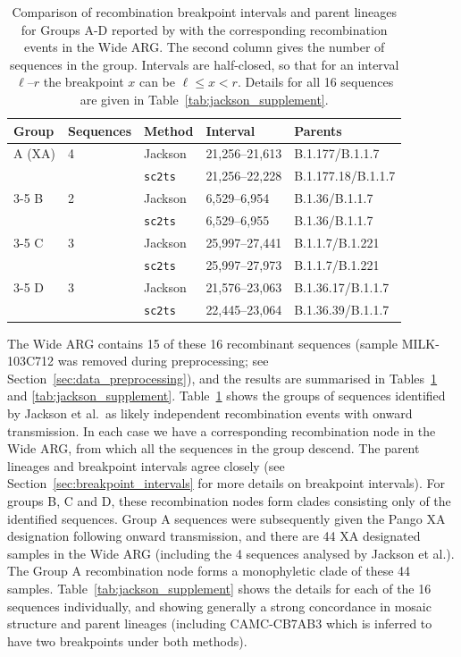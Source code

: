 \documentclass{article}
\begin{document}
\begin{table} \centering
\begin{tabular}{lllll}
\toprule
Group        & Sequences & Method & Interval & Parents \\
\midrule
A (XA)       & 4   & Jackson        &  21,256--21,613 & B.1.177/B.1.1.7 \\
             &     &\texttt{sc2ts} &  21,256--22,228 & B.1.177.18/B.1.1.7 \\
\cmidrule{3-5}
B            & 2   & Jackson        &  6,529--6,954 & B.1.36/B.1.1.7  \\
             &     &\texttt{sc2ts} &  6,529--6,955 & B.1.36/B.1.1.7  \\
\cmidrule{3-5}
C            & 3   &Jackson        &  25,997--27,441 &  B.1.1.7/B.1.221 \\
             &     & \texttt{sc2ts} &  25,997--27,973 &  B.1.1.7/B.1.221 \\
\cmidrule{3-5}
D            & 3   & Jackson        &  21,576--23,063 &  B.1.36.17/B.1.1.7 \\
             &     & \texttt{sc2ts} &  22,445--23,064 &  B.1.36.39/B.1.1.7 \\
\bottomrule
\end{tabular}
\caption{\label{tab:jackson}Comparison of recombination breakpoint
intervals and parent lineages for Groups A-D
reported by \cite{Jackson2021-ik} with the corresponding
recombination events in the Wide ARG.
The second column gives the number of sequences in the group.
Intervals are half-closed, so that for an interval $\ell$--$r$
the breakpoint $x$ can be $\ell \leq x < r$.
Details for all 16 sequences are
given in Table~\ref{tab:jackson_supplement}.}
\end{table}

The Wide ARG contains 15 of these 16 recombinant sequences
(sample MILK-103C712 was removed during preprocessing; see
Section~\ref{sec:data_preprocessing}), and the results are summarised
in Tables~\ref{tab:jackson} and \ref{tab:jackson_supplement}.
Table~\ref{tab:jackson} shows the groups of sequences identified by Jackson
et al.\ as likely independent recombination events with onward transmission.
In each case we have a corresponding recombination node in the Wide ARG,
from which all the sequences in the group descend. The parent lineages
and breakpoint intervals agree closely (see
Section~\ref{sec:breakpoint_intervals} for more details on breakpoint
intervals).
For groups B, C and D,
these recombination nodes form clades consisting only of the identified
sequences.
Group A sequences were subsequently given the Pango XA designation
following onward transmission,
and there are 44 XA designated samples in the Wide ARG (including the
4 sequences analysed by Jackson et al.). The Group A recombination
node forms a monophyletic clade of these 44 samples.
Table~\ref{tab:jackson_supplement} shows the details for each of the
16 sequences individually, and showing generally a strong concordance
in mosaic structure and parent lineages
(including CAMC-CB7AB3 which is inferred to have two breakpoints under both
methods).
\end{document}
